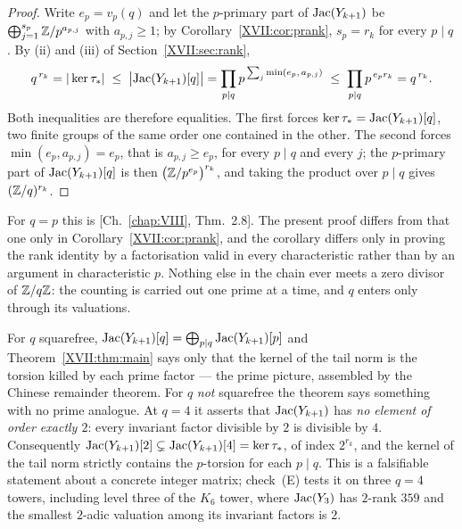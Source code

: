 \begin{proof}
Write $e_p=v_p(q)$ and let the $p$-primary part of $\operatorname{Jac}(Y_{k+1})$ be
$\bigoplus_{j=1}^{s_p}\mathbb{Z}/p^{a_{p,j}}$ with $a_{p,j}\ge1$; by
Corollary~\ref{XVII:cor:prank}, $s_p=r_k$ for every $p\mid q$. By (ii) and (iii) of
Section~\ref{XVII:sec:rank},
\[
q^{\,r_k}=|\ker\tau_*|\;\le\;\bigl|\operatorname{Jac}(Y_{k+1})[q]\bigr|
=\prod_{p\mid q}p^{\,\sum_{j}\min(e_p,\,a_{p,j})}
\;\le\;\prod_{p\mid q}p^{\,e_p r_k}=q^{\,r_k}.
\]
Both inequalities are therefore equalities. The first forces
$\ker\tau_*=\operatorname{Jac}(Y_{k+1})[q]$, two finite groups of the same order one contained in the
other. The second forces $\min(e_p,a_{p,j})=e_p$, that is $a_{p,j}\ge e_p$, for every
$p\mid q$ and every $j$; the $p$-primary part of $\operatorname{Jac}(Y_{k+1})[q]$ is then
$\bigl(\mathbb{Z}/p^{e_p}\bigr)^{r_k}$, and taking the product over $p\mid q$ gives
$(\mathbb{Z}/q)^{r_k}$.
\end{proof}

\begin{remark}\label{XVII:rem:whatwas}
For $q=p$ this is [Ch.~\ref{chap:VIII}, Thm.~2.8]. The present proof differs from that one only in
Corollary~\ref{XVII:cor:prank}, and the corollary differs only in proving the rank identity by
a factorisation valid in every characteristic rather than by an argument in
characteristic $p$. Nothing else in the chain ever meets a zero divisor of $\mathbb{Z}/q\mathbb{Z}$: the
counting is carried out one prime at a time, and $q$ enters only through its valuations.
\end{remark}

\begin{remark}\label{XVII:rem:powers}
For $q$ squarefree, $\operatorname{Jac}(Y_{k+1})[q]=\bigoplus_{p\mid q}\operatorname{Jac}(Y_{k+1})[p]$ and
Theorem~\ref{XVII:thm:main} says only that the kernel of the tail norm is the torsion killed by
each prime factor --- the prime picture, assembled by the Chinese remainder theorem. For
$q$ \emph{not} squarefree the theorem says something with no prime analogue. At $q=4$ it
asserts that $\operatorname{Jac}(Y_{k+1})$ has \emph{no element of order exactly $2$}: every invariant
factor divisible by $2$ is divisible by $4$. Consequently
$\operatorname{Jac}(Y_{k+1})[2]\subsetneq\operatorname{Jac}(Y_{k+1})[4]=\ker\tau_*$, of index $2^{r_k}$, and the kernel of
the tail norm strictly contains the $p$-torsion for each $p\mid q$. This is a falsifiable
statement about a concrete integer matrix; check~(E) tests it on three $q=4$ towers,
including level three of the $K_6$ tower, where $\operatorname{Jac}(Y_3)$ has $2$-rank $359$ and the
smallest $2$-adic valuation among its invariant factors is $2$.
\end{remark}

